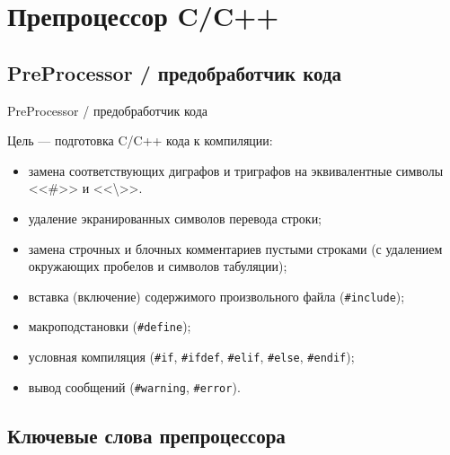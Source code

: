 \section{Препроцессор C/C++}

\subsection{PreProcessor / предобработчик кода}

\begin{frame}[t]{PreProcessor / предобработчик кода}

  Цель --- подготовка C/C++ кода к компиляции:
  
  \begin{itemize}
    \item замена соответствующих диграфов и триграфов на эквивалентные символы <<\#>> и <<\textbackslash>>.
    \item удаление экранированных символов перевода строки;
    \item замена строчных и блочных комментариев пустыми строками (с удалением окружающих пробелов и символов табуляции);
    \item вставка (включение) содержимого произвольного файла (\texttt{\#include});
    \item макроподстановки (\texttt{\#define});
    \item условная компиляция (\texttt{\#if}, \texttt{\#ifdef}, \texttt{\#elif}, \texttt{\#else}, \texttt{\#endif});
    \item вывод сообщений (\texttt{\#warning}, \texttt{\#error}).
  \end{itemize}
\end{frame}

\subsection{Ключевые слова препроцессора}

